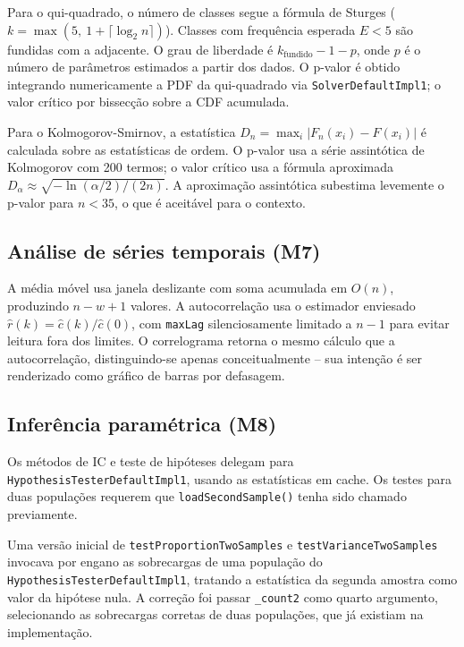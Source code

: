 Para o qui-quadrado, o número de classes segue a fórmula de Sturges ($k = \max(5,\ 1 + \lceil \log_2 n \rceil)$). Classes com frequência esperada $E < 5$ são fundidas com a adjacente. O grau de liberdade é $k_{\text{fundido}} - 1 - p$, onde $p$ é o número de parâmetros estimados a partir dos dados. O p-valor é obtido integrando numericamente a PDF da qui-quadrado via \texttt{SolverDefaultImpl1}; o valor crítico por bissecção sobre a CDF acumulada.

Para o Kolmogorov-Smirnov, a estatística $D_n = \max_i |F_n(x_i) - F(x_i)|$ é calculada sobre as estatísticas de ordem. O p-valor usa a série assintótica de Kolmogorov com 200 termos; o valor crítico usa a fórmula aproximada $D_\alpha \approx \sqrt{-\ln(\alpha/2)/(2n)}$. A aproximação assintótica subestima levemente o p-valor para $n < 35$, o que é aceitável para o contexto.

\subsection{Análise de séries temporais (M7)}

A média móvel usa janela deslizante com soma acumulada em $O(n)$, produzindo $n - w + 1$ valores. A autocorrelação usa o estimador enviesado $\hat{r}(k) = \hat{c}(k)/\hat{c}(0)$, com \texttt{maxLag} silenciosamente limitado a $n-1$ para evitar leitura fora dos limites. O correlograma retorna o mesmo cálculo que a autocorrelação, distinguindo-se apenas conceitualmente -- sua intenção é ser renderizado como gráfico de barras por defasagem.

\subsection{Inferência paramétrica (M8)}

Os métodos de IC e teste de hipóteses delegam para \texttt{HypothesisTesterDefaultImpl1}, usando as estatísticas em cache. Os testes para duas populações requerem que \texttt{loadSecondSample()} tenha sido chamado previamente.

Uma versão inicial de \texttt{testProportionTwoSamples} e \texttt{testVarianceTwoSamples} invocava por engano as sobrecargas de uma população do \texttt{HypothesisTesterDefaultImpl1}, tratando a estatística da segunda amostra como valor da hipótese nula. A correção foi passar \texttt{\_count2} como quarto argumento, selecionando as sobrecargas corretas de duas populações, que já existiam na implementação.

